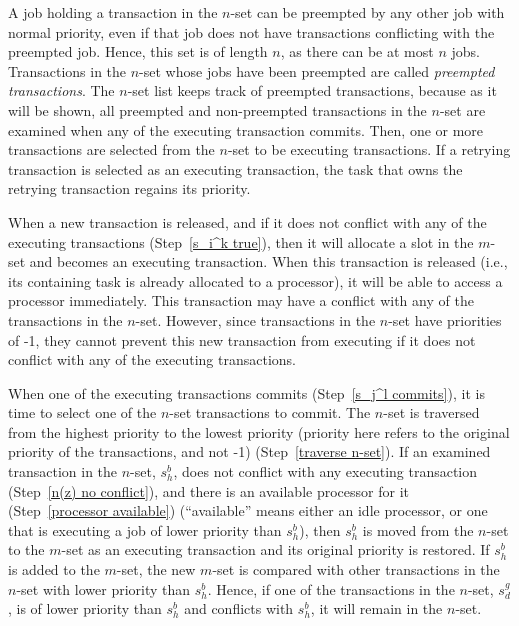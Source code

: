 \documentclass[twocolumn]{article}
\begin{document}
A job holding a transaction in the $n$-set can be preempted by any other job with normal priority, even if that job does not have transactions conflicting with the preempted job. Hence, this set is of length $n$, as there can be at most $n$ jobs. 
Transactions in the $n$-set whose jobs have been preempted are called \textit{preempted transactions}. The $n$-set list keeps track of preempted transactions, because
as it will be shown, all preempted and non-preempted transactions in the $n$-set are examined when any of the
executing transaction commits. Then, one or more transactions are selected from the $n$-set to be executing transactions. If a retrying transaction is selected as an executing transaction, the task that owns the retrying transaction regains its priority.

When a new transaction is released, and if it does not conflict with
any of the executing transactions (Step~\ref{s_i^k true}), then
it will allocate a slot in the $m$-set and becomes an
executing transaction. When this transaction is released (i.e., its containing task is already allocated to a processor), it will be able to access a processor immediately. 
This transaction may have a conflict with any of the transactions in the $n$-set. However, since transactions in the $n$-set have priorities of -1, they cannot prevent this new transaction from executing if it does not conflict with any of the executing transactions.

When one of the executing transactions commits (Step~\ref{s_j^l commits}), it is time to select one of the $n$-set transactions to commit. The $n$-set is traversed from the highest priority
to the lowest priority (priority here refers to the
original priority of the transactions, and not -1) (Step~\ref{traverse n-set}).
%
If an examined transaction in the $n$-set, $s_{h}^{b}$,
does not conflict with any executing transaction (Step~\ref{n(z) no conflict}),
and there is an available processor for it (Step~\ref{processor available})
(``available'' means either an idle processor, or one that
is executing a job of lower priority than $s_{h}^{b}$),
then $s_{h}^{b}$ is moved from the $n$-set to the
$m$-set as an executing transaction and its original priority is restored. 
%
If $s_{h}^{b}$ is added to the $m$-set, the new $m$-set is compared with other transactions in the $n$-set with lower priority than $s_{h}^{b}$. 
Hence, if one of the transactions in the $n$-set, $s_{d}^{g}$, is of
lower priority than $s_{h}^{b}$ and conflicts with $s_{h}^{b}$,  
it will remain in the $n$-set. 
\end{document}
